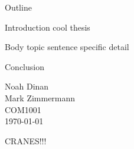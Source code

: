 \documentclass[12pt]{article}
\begin{document}
\begin{center}
Outline
\end{center}

\begin{outline}[enumerate]
    \1 Introduction
        \2 cool thesis

    \1 Body
        \2 topic sentence
            \3 specific detail

    \1 Conclusion

\end{outline}

\newpage

\noindent
Noah Dinan \\ Mark Zimmermann \\ COM1001 \\ \today \\

\begin{center}
CRANES!!!
\end{center}

\setlength{\parindent}{0.5in}
\end{document}
